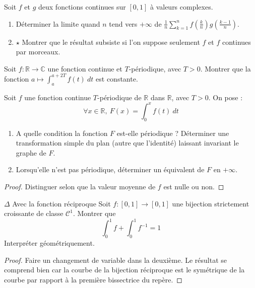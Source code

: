 \documentclass[french,a4paper]{article}
\newcommand{\R}{\mathbb{R}}
\newcommand{\C}{\mathbb{C}}
\newcommand{\inv}{^{-1}}
\theoremstyle{plain}
\theoremstyle{definition}
\theoremstyle{remark}
\begin{document}
\begin{ex}[Moulin.IG.04]{}
	Soit $f$ et $g$ deux fonctions continues sur $[0,1]$ à valeurs complexes.
	\begin{enumerate}
		\item Déterminer la limite quand $n$ tend vers $+\infty$ de $\displaystyle\frac{1}{n}\sum_{k=1}^{n}f\left(\frac{k}{n}\right)g\left(\frac{k-1}{n}\right)$.
		\item $\star$ Montrer que le résultat subsiste si l'on suppose seulement $f$ et $f$ continues par morceaux.
	\end{enumerate}
\end{ex}

\begin{ex}[Moulin.IG.05]{}
	Soit $f:\R\to\C$ une fonction continue et $T$-périodique, avec $T>0$. Montrer que la fonction $\displaystyle a\mapsto\int_{a}^{a+2T}f(t)\ dt$ est constante.
\end{ex}

\begin{ex}[Moulin.IG.06]{}
	Soit $f$ une fonction continue $T$-périodique de $\R$ dans $\R$, avec $T>0$. On pose : $$\forall x\in\R,\ F(x)=\int_{0}^{x}f(t)\ dt$$
	\begin{enumerate}
		\item A quelle condition la fonction $F$ est-elle périodique ? Déterminer une transformation simple du plan (autre que l'identité) laissant invariant le graphe de $F$.
		\item Lorsqu'elle n'est pas périodique, déterminer un équivalent de $F$ en $+\infty$.
	\end{enumerate}
\end{ex}
\begin{proof}
	Distinguer selon que la valeur moyenne de $f$ est nulle ou non.
\end{proof}

\begin{ex}[Moulin.IG.07]{$\Delta$ Avec la fonction réciproque}
	Soit $f:[0,1]\to[0,1]$ une bijection strictement croissante de classe $\mathcal{C}^1$. Montrer que $$\int_{0}^{1}f+\int_{0}^{1}f\inv=1$$ Interpréter géométriquement.
\end{ex}

\begin{proof}
	Faire un changement de variable dans la deuxième. Le résultat se comprend bien car la courbe de la bijection réciproque est le symétrique de la courbe par rapport à la première bissectrice du repère.
\end{proof}
\end{document}

